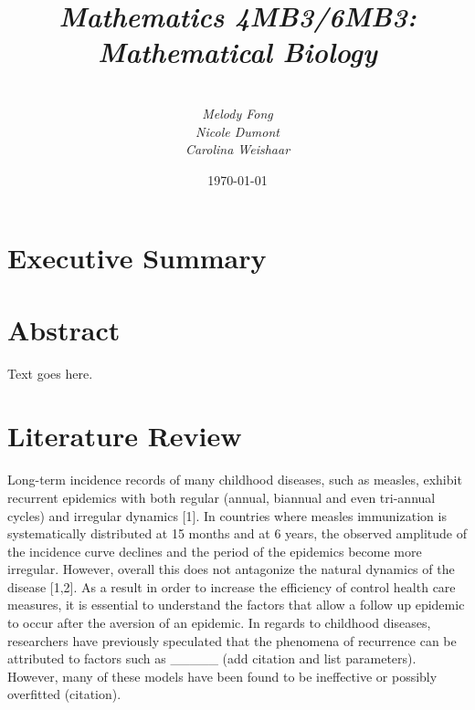 \documentclass[twocolumn,nofootinbib,showkeys,twoside,floatfix,unsortedaddress,flushbottom,10pt,aps,pra]{report}
\author{\sc{Model Students:}\\
 \small \emph{Melody Fong} \\
 \small \emph{Nicole Dumont} \\
 \small  \emph{Carolina Weishaar}}
\title{ \small \emph{Mathematics 4MB3/6MB3: Mathematical Biology }\\
  \Huge \sc{Spatial Epidemics Dynamics:\\ Synchronization}}
\date{\today}
\begin{document}
\pagestyle{fancy}

\maketitle
\tableofcontents

\onecolumn
\section*{\Huge Executive Summary}
%
\lipsum[34]

\twocolumn

\section{Abstract} Text goes here.
\section{Literature Review }
Long-term incidence records of many childhood diseases, such as measles, exhibit recurrent epidemics with  both regular (annual, biannual and even tri-annual cycles) and irregular dynamics [1]. In countries where measles immunization is systematically distributed at 15 months and at 6 years, the observed amplitude of the incidence curve declines and the period of the epidemics become more irregular. However, overall this does not antagonize the natural dynamics of the disease [1,2]. As a result in order to increase the efficiency of control health care measures, it is essential to understand the factors that allow a follow up epidemic to occur after the aversion of an epidemic. In regards to childhood diseases, researchers have previously speculated that the phenomena of recurrence can be attributed to factors such as _____ (add citation and list parameters). However, many of these models have been found to be ineffective or possibly overfitted (citation). 
\end{document}
